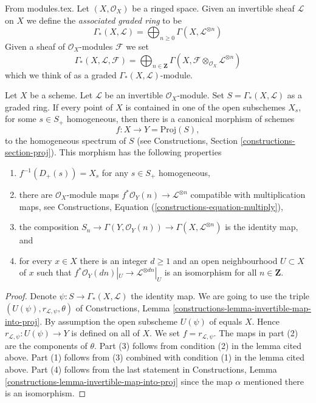 \begin{definition}
\label{definition-gamma-star}
From modules.tex. Let $(X, \mathcal{O}_X)$ be a ringed space.
Given an invertible sheaf $\mathcal{L}$ on $X$ we define
the {\it associated graded ring} to be
$$
\Gamma_*(X, \mathcal{L})
=
\bigoplus\nolimits_{n \geq 0} \Gamma(X, \mathcal{L}^{\otimes n})
$$
Given a sheaf of $\mathcal{O}_X$-modules $\mathcal{F}$ we set
$$
\Gamma_*(X, \mathcal{L}, \mathcal{F})
=
\bigoplus\nolimits_{n \in \mathbf{Z}} \Gamma(X,
\mathcal{F} \otimes_{\mathcal{O}_X} \mathcal{L}^{\otimes n})
$$
which we think of as a graded $\Gamma_*(X, \mathcal{L})$-module.
\end{definition}

\begin{lemma}
\label{lemma-map-into-proj}
Let $X$ be a scheme.
Let $\mathcal{L}$ be an invertible $\mathcal{O}_X$-module.
Set $S = \Gamma_*(X, \mathcal{L})$ as a graded ring.
If every point of $X$ is contained in one of the
open subschemes $X_s$, for some $s \in S_{+}$ homogeneous, then
there is a canonical morphism of schemes
$$
f : X \longrightarrow Y = \text{Proj}(S),
$$
to the homogeneous spectrum of $S$ (see
Constructions, Section \ref{constructions-section-proj}).
This morphism has the following properties
\begin{enumerate}
\item $f^{-1}(D_{+}(s)) = X_s$ for any $s \in S_{+}$ homogeneous,
\item there are $\mathcal{O}_X$-module maps
$f^*\mathcal{O}_Y(n) \to \mathcal{L}^{\otimes n}$
compatible with multiplication maps, see
Constructions, Equation (\ref{constructions-equation-multiply}),
\item the composition
$S_n \to \Gamma(Y, \mathcal{O}_Y(n)) \to \Gamma(X, \mathcal{L}^{\otimes n})$
is the identity map, and
\item for every $x \in X$ there is an integer $d \geq 1$
and an open neighbourhood $U \subset X$ of $x$
such that $f^*\mathcal{O}_Y(dn)|_U \to \mathcal{L}^{\otimes dn}|_U$
is an isomorphism for all $n \in \mathbf{Z}$.
\end{enumerate}
\end{lemma}

\begin{proof}
Denote $\psi : S \to \Gamma_*(X, \mathcal{L})$ the identity map.
We are going to use the triple
$(U(\psi), r_{\mathcal{L}, \psi}, \theta)$ of
Constructions, Lemma \ref{constructions-lemma-invertible-map-into-proj}.
By assumption the open subscheme $U(\psi)$ of equals $X$. Hence
$r_{\mathcal{L}, \psi} : U(\psi) \to Y$ is defined on all of $X$.
We set $f = r_{\mathcal{L}, \psi}$.
The maps in part (2) are the components of $\theta$.
Part (3) follows from condition (2) in the lemma cited above.
Part (1) follows from (3) combined with condition (1) in the lemma
cited above. Part (4) follows from the last statement in
Constructions, Lemma \ref{constructions-lemma-invertible-map-into-proj}
since the map $\alpha$ mentioned there is an isomorphism.
\end{proof}

